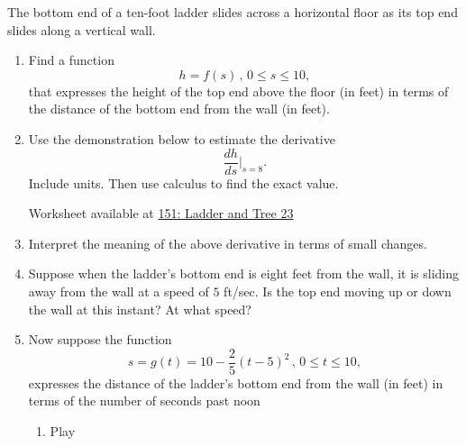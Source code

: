 \documentclass{ximera}
\begin{document}
\begin{question}  \label{QPERdgfret}
The bottom end of a ten-foot ladder slides across a horizontal floor as its top end slides along a vertical wall.

\begin{enumerate}
\item Find a function
\[
   h = f(s) \, , \, 0\leq s \leq 10 ,
\]
that expresses the height of the top end above the floor (in feet) in terms of the distance of the bottom end from the wall (in feet).

\item Use the demonstration below to estimate the derivative
\[
    \frac{dh}{ds}\Big|_{s=8}.
\]
Include units. Then use calculus to find the exact value.

\begin{onlineOnly}
    \begin{center}
\end{center}
\end{onlineOnly}

Worksheet available at \href{https://www.desmos.com/calculator/jqwsnh33o1}{151: Ladder and Tree 23} 

\item Interpret the meaning of the above derivative in terms of small changes.

\item Suppose when the ladder's bottom end is eight feet from the wall, it is sliding away from the wall at a speed of $5$ ft/sec. Is the top end moving up or down the wall at this instant? At what speed?

\item Now suppose the function
\[
    s = g(t)= 10-\frac{2}{5}(t-5)^2\, , \, 0\leq t \leq 10 ,
\]
expresses the distance of the ladder's bottom end from the wall (in feet) in terms of the number of seconds past noon

\begin{enumerate}
\item Play 
\end{enumerate}


\end{enumerate}

\end{question}
\end{document}
